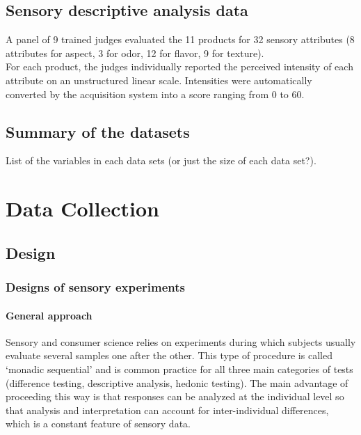 \documentclass[
]{book}
\begin{document}
\hypertarget{sensory-descriptive-analysis-data}{%
\section{Sensory descriptive analysis data}\label{sensory-descriptive-analysis-data}}

A panel of 9 trained judges evaluated the 11 products for 32 sensory attributes (8 attributes for aspect, 3 for odor, 12 for flavor, 9 for texture).\\
For each product, the judges individually reported the perceived intensity of each attribute on an unstructured linear scale. Intensities were automatically converted by the acquisition system into a score ranging from 0 to 60.

\hypertarget{summary-of-the-datasets}{%
\section{Summary of the datasets}\label{summary-of-the-datasets}}

List of the variables in each data sets (or just the size of each data set?).

\hypertarget{data-collection}{%
\chapter{Data Collection}\label{data-collection}}

\hypertarget{design-1}{%
\section{Design}\label{design-1}}

\hypertarget{designs-of-sensory-experiments}{%
\subsection{Designs of sensory experiments}\label{designs-of-sensory-experiments}}

\hypertarget{general-approach}{%
\subsubsection{General approach}\label{general-approach}}

Sensory and consumer science relies on experiments during which subjects usually evaluate several samples one after the other. This type of procedure is called `monadic sequential' and is common practice for all three main categories of tests (difference testing, descriptive analysis, hedonic testing). The main advantage of proceeding this way is that responses can be analyzed at the individual level so that analysis and interpretation can account for inter-individual differences, which is a constant feature of sensory data.
\end{document}
